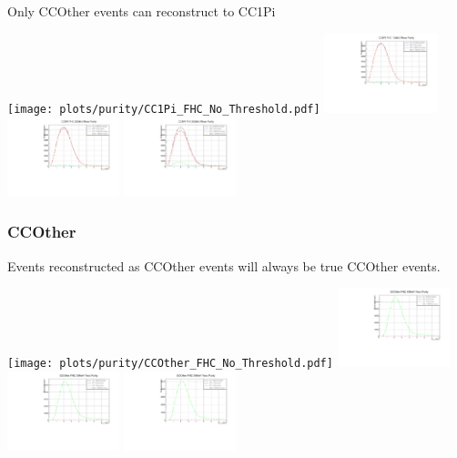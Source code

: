 Only CCOther events can reconstruct to CC1Pi

\begin{center}

\texttt{[image: plots/purity/CC1Pi\_FHC\_No\_Threshold.pdf]}
\includegraphics[width=0.245\textwidth]{plots/purity/CC1Pi_FHC_10MeV.pdf} 
\includegraphics[width=0.245\textwidth]{plots/purity/CC1Pi_FHC_20MeV.pdf}
\includegraphics[width=0.245\textwidth]{plots/purity/CC1Pi_FHC_50MeV.pdf}

\end{center}

\subsubsection{CCOther}

Events reconstructed as CCOther events will always be true CCOther events.

\begin{center}

\texttt{[image: plots/purity/CCOther\_FHC\_No\_Threshold.pdf]}
\includegraphics[width=0.245\textwidth]{plots/purity/CCOther_FHC_10MeV.pdf} 
\includegraphics[width=0.245\textwidth]{plots/purity/CCOther_FHC_20MeV.pdf}
\includegraphics[width=0.245\textwidth]{plots/purity/CCOther_FHC_50MeV.pdf}

\end{center}


